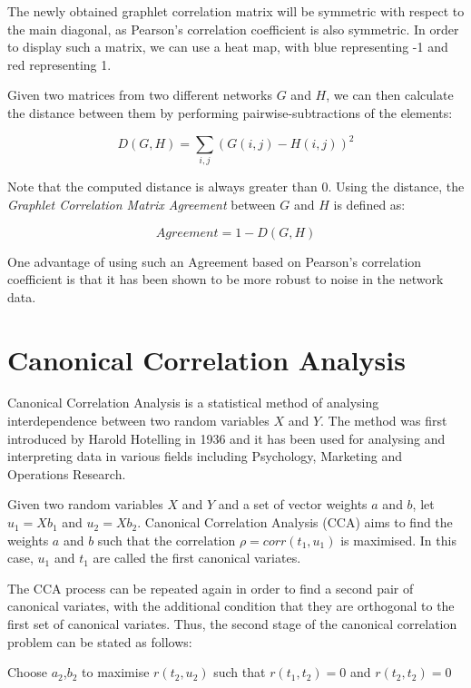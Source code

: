The newly obtained graphlet correlation matrix will be symmetric with respect to 
the main diagonal, as Pearson's correlation coefficient is also symmetric. In
order to display such a matrix, we can use a heat map, with blue representing -1
and red representing 1.

Given two matrices from two different networks $G$ and $H$, we can then calculate
the distance between them by performing pairwise-subtractions of the elements:

$$ D(G,H) = \sum_{i,j}\left(G(i,j) - H(i,j)\right)^2  $$

Note that the computed distance is always greater than 0. Using the distance,
the \emph{Graphlet Correlation Matrix Agreement} between $G$ and $H$ is
defined as: 

$$ Agreement = 1 - D(G,H) $$

One advantage of using such an Agreement based on Pearson's correlation
coefficient is that it has been shown to be more robust to noise in the network
data\cite{kuchaiev2009learning}.

\section{Canonical Correlation Analysis}

Canonical Correlation Analysis is a statistical method of analysing interdependence 
between two random variables $X$ and $Y$. The method was first introduced by 
Harold Hotelling in 1936\cite{hotelling1936relations} and it has been used for 
analysing and interpreting data in various fields including 
Psychology\cite{cooley1971multivariate}, Marketing\cite{fader1990cross} and 
Operations Research\cite{pisharodi1991interset}.

Given two random variables $X$ and $Y$ and a set of vector weights $a$ and $b$, 
let $u_1 = Xb_1$ and $u_2 = Xb_2$. Canonical Correlation Analysis (CCA) aims to 
find the weights $a$ and $b$ such that the correlation $ \rho = corr(t_1, u_1) $
is maximised. In this case, $u_1$ and $t_1$ are called the first canonical variates. 

The CCA process can be repeated again in order to find a second pair of canonical 
variates, with the additional condition that they are orthogonal to the first set 
of canonical variates. Thus, the second stage of the canonical correlation problem 
can be stated as follows:

Choose $a_2$,$b_2$ to maximise $r(t_2, u_2)$ such that $r(t_1, t_2) = 0$ and $r(t_2, t_2) = 0$ 

